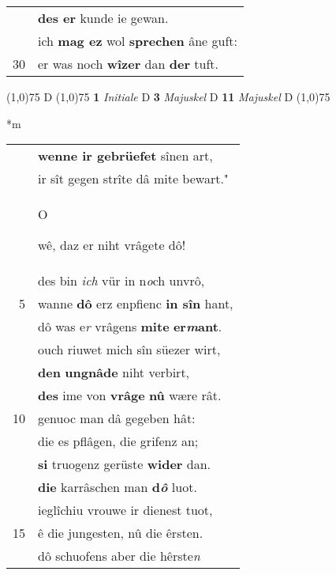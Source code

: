 \documentclass[8pt,a4paper,notitlepage]{article}
\begin{document}
\begin{table}[ht]
\begin{minipage}[t]{0.5\linewidth}
\begin{tabular}{rl}
 & \textbf{des er} kunde ie gewan.\\ 
 & ich \textbf{mag ez} wol \textbf{sprechen} âne guft:\\ 
30 & er was noch \textbf{wîzer} dan \textbf{der} tuft.\\ 
\end{tabular}
\scriptsize
\line(1,0){75} \newline
D \newline
\line(1,0){75} \newline
\textbf{1} \textit{Initiale} D  \textbf{3} \textit{Majuskel} D  \textbf{11} \textit{Majuskel} D  \newline
\line(1,0){75} \newline
\newline
\end{minipage}
\hspace{0.5cm}
\begin{minipage}[t]{0.5\linewidth}
\small
\begin{center}*m
\end{center}
\begin{tabular}{rl}
 & \textbf{wenne ir gebrüefet} sînen art,\\ 
 & ir sît gegen strîte dâ mite bewart."\\ 
 & \begin{large}O\end{large}wê, daz er niht vrâgete dô!\\ 
 & des bin \textit{ich} vür in n\textit{o}ch unvrô,\\ 
5 & wanne \textbf{dô} erz enpfienc \textbf{in sîn} hant,\\ 
 & dô was e\textit{r} vrâgens \textbf{mite} \textbf{er\textit{m}ant}.\\ 
 & ouch riuwet mich sîn süezer wirt,\\ 
 & \textbf{den} \textbf{ungnâde} niht verbirt,\\ 
 & \textbf{des} ime von \textbf{vrâge} \textbf{nû} wære rât.\\ 
10 & genuoc man dâ gegeben hât:\\ 
 & die es pflâgen, die grifenz an;\\ 
 & \textbf{si} truogenz gerüste \textbf{wider} dan.\\ 
 & \textbf{die} karrâschen man \textbf{d\textit{ô}} luot.\\ 
 & ieglîchiu vrouwe ir dienest tuot,\\ 
15 & ê die jungesten, nû die êrsten.\\ 
 & dô schuofens aber die hêrste\textit{n}\\ 

\end{tabular}
\end{minipage}
\end{table}
\end{document}
